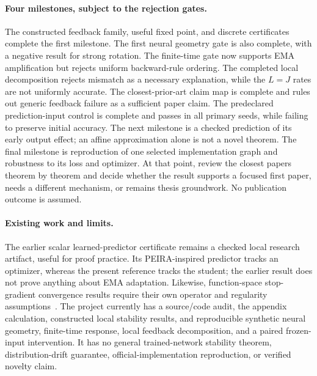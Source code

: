 \documentclass[11pt,a4paper]{article}
\begin{document}
\paragraph{Four milestones, subject to the rejection gates.}
The constructed feedback family, useful fixed point, and discrete
certificates complete the first milestone. The first neural geometry gate
is also complete, with a negative result for strong rotation. The finite-time
gate now supports EMA amplification but rejects uniform backward-rule
ordering. The completed local decomposition rejects mismatch as a
necessary explanation, while the $L=J$ rates are not uniformly
accurate. The closest-prior-art claim map is complete and rules out
generic feedback failure as a sufficient paper claim. The predeclared
prediction-input control is complete and passes in all primary seeds,
while failing to preserve initial accuracy. The next milestone is a
checked prediction of its early output effect; an affine approximation
alone is not a novel theorem. The final milestone is reproduction of one
selected implementation graph and robustness to its loss and optimizer.
At that point, review the closest
papers theorem by theorem and decide whether the result supports a focused
first paper, needs a different mechanism, or remains thesis groundwork.
No publication outcome is assumed.

\paragraph{Existing work and limits.}
The earlier scalar learned-predictor certificate remains a checked local
research artifact, useful for proof practice. Its PEIRA-inspired predictor
tracks an optimizer, whereas the present reference tracks the student;
the earlier result does not prove anything about EMA adaptation. Likewise,
function-space stop-gradient convergence results require their own operator
and regularity assumptions~\cite{stopgrads}. The project currently has a source/code audit, the appendix calculation,
constructed local stability results, and reproducible synthetic neural
geometry, finite-time response, local feedback decomposition, and a
paired frozen-input intervention.
It has no general trained-network stability theorem,
distribution-drift guarantee, official-implementation reproduction,
or verified novelty claim.

\medskip
{}
\end{document}
